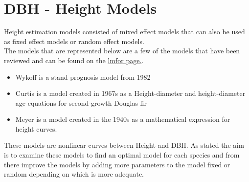 \documentclass[a4paper,11pt,twoside]{report}
\begin{document}
\section{DBH - Height Models}

Height estimation models consisted of mixed effect models that can also be used as fixed effect models or random effect models. \\
The models that are represented below are a few of the models  that have been reviewed and can be found on the \href{https://cran.r-project.org/web/packages/lmfor/lmfor.pdf}{lmfor page.}.
\begin{itemize}
    \item Wykoff is a stand prognosis model from 1982 \cite{wykoff1982user}
    \item Curtis is a model created in 1967s as a Height-diameter and height-diameter age equations for
second-growth Douglas fir\cite{Curtis}
\item Meyer is a model created in the 1940s as a mathematical expression for height curves. \cite{Meyer}
\end{itemize}
These models are nonlinear curves between Height and DBH. As stated the aim is to examine these models to find an optimal model for each species and from there improve the models by adding more parameters to the model fixed or random depending on which is more adequate. 
\end{document}
